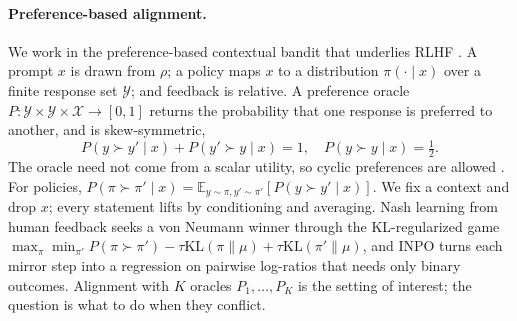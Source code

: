 \documentclass[letterpaper]{article} %
\newcommand{\Y}{\mathcal{Y}}
\newcommand{\KL}{\mathrm{KL}}
\newcommand{\E}{\mathbb{E}}
\begin{document}
\paragraph{Preference-based alignment.}
We work in the preference-based contextual bandit that underlies RLHF \citep{yue2012karmed,dudik2015contextual}. A prompt $x$ is drawn from $\rho$; a policy maps $x$ to a distribution $\pi(\cdot\mid x)$ over a finite response set $\Y$; and feedback is relative. A preference oracle $P:\Y\times\Y\times\mathcal{X}\to[0,1]$ returns the probability that one response is preferred to another, and is skew-symmetric,
\begin{equation}
P(y\succ y'\mid x)+P(y'\succ y\mid x)=1,\quad P(y\succ y\mid x)=\tfrac12 .
\label{eq:skew}
\end{equation}
The oracle need not come from a scalar utility, so cyclic preferences are allowed \citep{may1954intransitivity}. For policies, $P(\pi\succ\pi'\mid x)=\E_{y\sim\pi,y'\sim\pi'}[P(y\succ y'\mid x)]$. We fix a context and drop $x$; every statement lifts by conditioning and averaging. Nash learning from human feedback \citep{munos2024nash,azar2024general} seeks a von Neumann winner through the KL-regularized game $\max_\pi\min_{\pi'}P(\pi\succ\pi')-\tau\KL(\pi\|\mu)+\tau\KL(\pi'\|\mu)$, and INPO \citep{zhang2025iterative} turns each mirror step into a regression on pairwise log-ratios that needs only binary outcomes. Alignment with $K$ oracles $P_1,\dots,P_K$ is the setting of interest; the question is what to do when they conflict.
\end{document}
